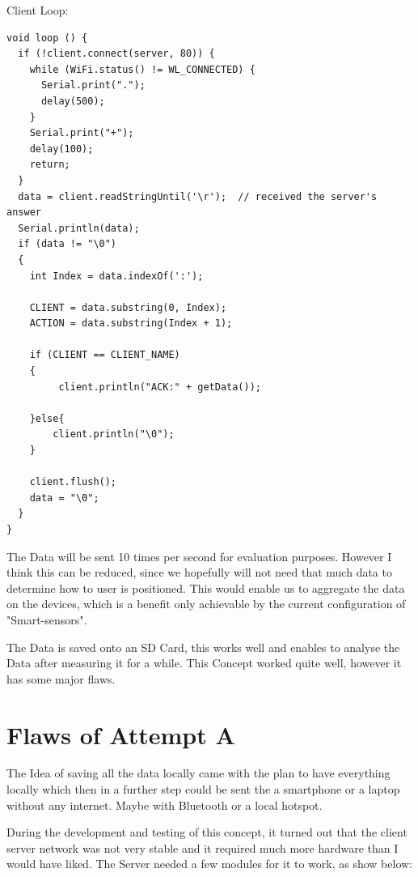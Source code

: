 Client Loop:

\begin{lstlisting}
void loop () {
  if (!client.connect(server, 80)) {
    while (WiFi.status() != WL_CONNECTED) {
      Serial.print(".");
      delay(500);
    }
    Serial.print("+");
    delay(100);
    return;
  }
  data = client.readStringUntil('\r');  // received the server's answer
  Serial.println(data);
  if (data != "\0")
  {
    int Index = data.indexOf(':');

    CLIENT = data.substring(0, Index);
    ACTION = data.substring(Index + 1);

    if (CLIENT == CLIENT_NAME)
    {
         client.println("ACK:" + getData());
      
    }else{
        client.println("\0");
    }

    client.flush();
    data = "\0";
  }
}
\end{lstlisting}

The Data will be sent 10 times per second for evaluation purposes. 
However I think this can be reduced, since we hopefully will not need that much data to determine how to user is positioned. This would enable us to aggregate the data on the devices, which is a benefit only achievable by the current configuration of "Smart-sensors".

The Data is saved onto an SD Card, this works well and enables to analyse the Data after measuring it for a while. This Concept worked quite well, however it has some major flaws. 

\section{Flaws of Attempt A}

The Idea of saving all the data locally came with the plan to have everything locally which then in a further step could be sent the a smartphone or a laptop without any internet. Maybe with Bluetooth or a local hotspot. 

During the development and testing of this concept, it turned out that the client server network was not very stable and it required much more hardware than I would have liked. 
The Server needed a few modules for it to work, as show below:


